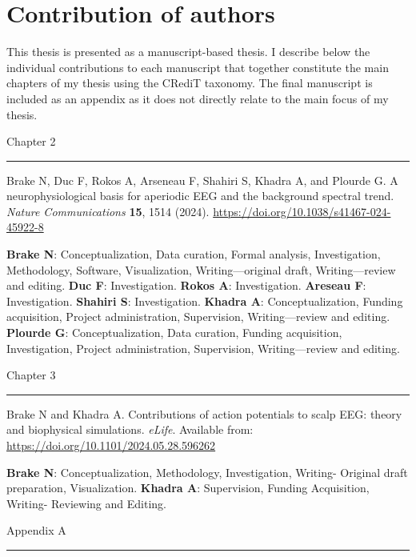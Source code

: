 \chapter*{Contribution of authors}

\setlength{\parindent}{0pt}
\setlength{\parskip}{3pt}

This thesis is presented as a manuscript-based thesis. I describe below the individual contributions to each manuscript that together constitute the main chapters of my thesis using the CRediT taxonomy. The final manuscript is included as an appendix as it does not directly relate to the main focus of my thesis.

\vspace{.5em} 
Chapter 2 \hrule

\hangindent=1cm Brake N, Duc F, Rokos A, Arseneau F, Shahiri S, Khadra A, and Plourde G. A neurophysiological basis for aperiodic EEG and the background spectral trend. \textit{Nature Communications} \textbf{15}, 1514 (2024). \url{https://doi.org/10.1038/s41467-024-45922-8}

{\small \textbf{Brake N}: Conceptualization, Data curation, Formal analysis, Investigation, Methodology, Software, Visualization, Writing—original draft, Writing—review and editing. \textbf{Duc F}: Investigation. \textbf{Rokos A}: Investigation. \textbf{Areseau F}: Investigation. \textbf{Shahiri S}: Investigation. \textbf{Khadra A}: Conceptualization, Funding acquisition, Project administration, Supervision, Writing—review and editing. \textbf{Plourde G}: Conceptualization, Data curation, Funding acquisition, Investigation, Project administration, Supervision, Writing—review and editing.}

\vspace{.5em} Chapter 3 \hrule

\hangindent=1cm Brake N and Khadra A. Contributions of action potentials to scalp EEG: theory and biophysical simulations. \textit{eLife}. Available from: \url{https://doi.org/10.1101/2024.05.28.596262}

{\small \textbf{Brake N}: Conceptualization, Methodology, Investigation, Writing- Original draft preparation, Visualization. \textbf{Khadra A}: Supervision, Funding Acquisition, Writing- Reviewing and Editing.}

\vspace{.5em} 

Appendix A \hrule

